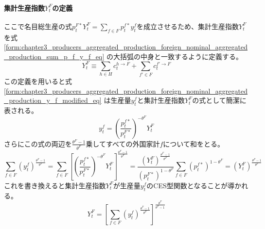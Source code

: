\paragraph{集計生産指数\(Y_t^F\)の定義}
\label{sec:chapter3_producers_aggregated_production_foreign_Y_F_definition}
ここで名目総生産の式\(p_t^{F*}Y_t^F=\sum_{f\in F}p_t^{f*}y_t^f\)を成立させるため、集計生産指数\(Y_t^F\)を式
\eqref{form:chapter3_producers_aggregated_production_foreign_nominal_aggregated_production_sum_p_f_y_f_eq}
の大括弧の中身と一致するように定義する。
\begin{equation}
\label{form:chapter3_producers_aggregated_production_foreign_Y_F_definition_Y_F_def}
    Y_t^F\equiv\sum_{h\in H}c_t^{h\to F}+\sum_{f'\in F}c_t^{f'\to F}
\end{equation}
この定義を用いると式
\eqref{form:chapter3_producers_aggregated_production_foreign_nominal_aggregated_production_y_f_modified_eq}
は生産量\(y_t^f\)と集計生産指数\(Y_t^F\)の式として簡潔に表される。
\begin{equation}
\label{form:chapter3_producers_aggregated_production_foreign_Y_F_definition_y_f_eq}
    y_t^f=\left(\frac{p_t^{f*}}{p_t^{F*}}\right)^{-\theta^F}Y_t^F
\end{equation}
さらにこの式の両辺を\(\frac{\theta^F-1}{\theta^F}\)乗してすべての外国家計\(f\)について和をとる。
\begin{equation}
\label{form:chapter3_producers_aggregated_production_foreign_Y_F_definition_sum_y_f_eq}
    \sum_{f\in F}(y_t^f)^{\frac{\theta^F-1}{\theta^F}}
    =\sum_{f\in F}\left[\left(\frac{p_t^{f*}}{p_t^{F*}}\right)^{-\theta^F}Y_t^F\right]^{\frac{\theta^F-1}{\theta^F}}
    =\frac{(Y_t^F)^{\frac{\theta^F-1}{\theta^F}}}{(p_t^{F*})^{1-\theta^F}}\sum_{f\in F}(p_t^{f*})^{1-\theta^F}
    =(Y_t^F)^{\frac{\theta^F-1}{\theta^F}}
\end{equation}
これを書き換えると集計生産指数\(Y_t^F\)が生産量\(y_t^f\)のCES型関数となることが導かれる。
\begin{equation}
\label{form:chapter3_producers_aggregated_production_foreign_Y_F_definition_Y_F_eq}
    Y_t^F=\left[\sum_{f\in F}(y_t^f)^{\frac{\theta^F-1}{\theta^F}}\right]^{\frac{\theta^F}{\theta^F-1}}
\end{equation}

